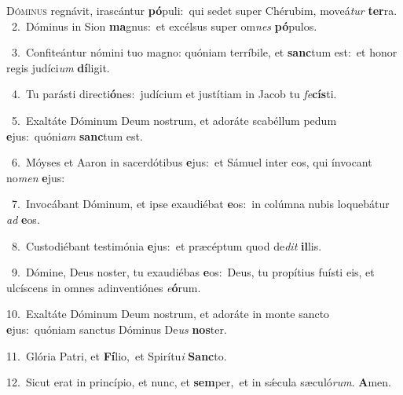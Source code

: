 \lettrine{\initial\textcolor{\initialcolor}{D}}{óminus} regnávit, irascántur \textbf{pó}\-puli:~\star qui sedet super Chérubim, moveá\textit{tur} \textbf{ter}\-ra.\\
{\numbfont\textcolor{\numbcolor}{~2.}}~Dóminus in Sion \textbf{ma}\-gnus:~\star et excélsus super om\textit{nes} \textbf{pó}\-pulos.\par
{\numbfont\textcolor{\numbcolor}{~3.}}~Confiteántur nómini tuo magno: quóniam terríbile, et \textbf{sanc}\-tum est:~\star et honor regis judíci\textit{um} \textbf{dí}\-ligit.\par
{\numbfont\textcolor{\numbcolor}{~4.}}~Tu parásti directi\-\textbf{ó}\-nes:~\star judícium et justítiam in Jacob tu \textit{fe}\-\textbf{cís}ti.\par
{\numbfont\textcolor{\numbcolor}{~5.}}~Exaltáte Dóminum Deum nostrum, et adoráte scabéllum pedum \textbf{e}\-jus:~\star quóni\textit{am} \textbf{sanc}\-tum est.\par
{\numbfont\textcolor{\numbcolor}{~6.}}~Móyses et Aaron in sacerdótibus \textbf{e}\-jus:~\star et Sámuel inter eos, qui ínvocant no\textit{men} \textbf{e}\-jus:\par
{\numbfont\textcolor{\numbcolor}{~7.}}~Invocábant Dóminum, et ipse exaudiébat \textbf{e}\-os:~\star in colúmna nubis loquebátur \textit{ad} \textbf{e}\-os.\par
{\numbfont\textcolor{\numbcolor}{~8.}}~Custodiébant testimónia \textbf{e}\-jus:~\star et præcéptum quod de\textit{dit} \textbf{il}\-lis.\par
{\numbfont\textcolor{\numbcolor}{~9.}}~Dómine, Deus noster, tu exaudiébas \textbf{e}\-os:~\star Deus, tu propítius fuísti eis, et ulcíscens in omnes adinventiónes \textit{e}\-\textbf{ó}rum.\par
{\numbfont\textcolor{\numbcolor}{10.}}~Exaltáte Dóminum Deum nostrum, et adoráte in monte sancto \textbf{e}\-jus:~\star quóniam sanctus Dóminus De\textit{us} \textbf{nos}\-ter.\par
{\numbfont\textcolor{\numbcolor}{11.}}~Glória Patri, et \textbf{Fí}\-lio,~\star et Spirítu\textit{i} \textbf{Sanc}\-to.\par
{\numbfont\textcolor{\numbcolor}{12.}}~Sicut erat in princípio, et nunc, et \textbf{sem}\-per,~\star et in sǽcula sæculó\-\textit{rum}\-. \textbf{A}\-men.\par
